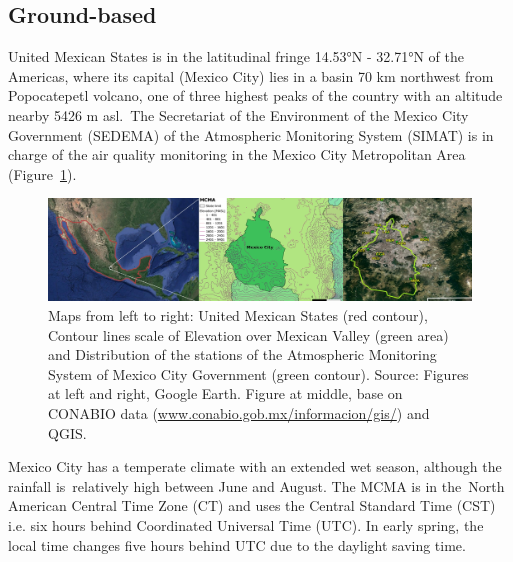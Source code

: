 \documentclass[10pt]{article}
\begin{document}
\subsection*{Ground-based~}

{\label{339070}}

United Mexican States is in the latitudinal fringe 14.53°N - 32.71°N of
the Americas, where its capital (Mexico City) lies in a basin 70 km
northwest from Popocatepetl volcano, one of three highest peaks of the
country with an altitude nearby 5426 m asl.~The Secretariat of the
Environment of the Mexico City Government (SEDEMA) of the Atmospheric
Monitoring System (SIMAT) is in charge of the air quality monitoring in
the Mexico City Metropolitan Area
(Figure~{\ref{547698}}).~~
\begin{figure}[H]
\begin{center}
\includegraphics[width=0.84\columnwidth]{figures/cdmx}
\caption{{Maps from left to right: United Mexican States (red contour), Contour
lines scale of Elevation over Mexican Valley (green area) and
Distribution of the stations of the Atmospheric Monitoring System of
Mexico City Government (green contour). Source: Figures at left and
right, Google Earth. Figure at middle, base on CONABIO data
(\href{http://www.conabio.gob.mx/informacion/gis/}{www.conabio.gob.mx/informacion/gis/})
and QGIS.
{\label{547698}}%
}}
\end{center}
\end{figure}

Mexico City has a temperate climate with an extended wet season,
although the rainfall is~relatively high between June and August. The
MCMA is in the~North American Central Time Zone (CT) and uses the
Central Standard Time (CST) i.e. six hours behind Coordinated Universal
Time (UTC). In early spring, the local time changes five hours behind
UTC due to the daylight saving time.
\end{document}
